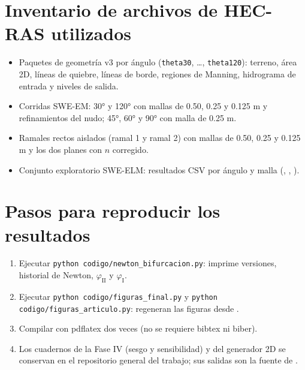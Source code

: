 \section{Inventario de archivos de HEC-RAS utilizados}
\begin{itemize}
\item Paquetes de geometría v3 por ángulo (\texttt{theta30}, \dots, \texttt{theta120}): terreno, área 2D, líneas de quiebre, líneas de borde, regiones de Manning, hidrograma de entrada y niveles de salida.
\item Corridas SWE-EM: 30° y 120° con mallas de 0.50, 0.25 y 0.125 m y refinamientos del nudo; 45°, 60° y 90° con malla de 0.25 m.
\item Ramales rectos aislados (ramal 1 y ramal 2) con mallas de 0.50, 0.25 y 0.125 m y los dos planes con $n$ corregido.
\item Conjunto exploratorio SWE-ELM: resultados CSV por ángulo y malla (, , ).
\end{itemize}

\section{Pasos para reproducir los resultados}
\begin{enumerate}
\item Ejecutar \texttt{python codigo/newton\_bifurcacion.py}: imprime versiones, historial de Newton, $\varphi_{\mathrm{II}}$ y $\varphi_{\mathrm I}$.
\item Ejecutar \texttt{python codigo/figuras\_final.py} y \texttt{python codigo/figuras\_articulo.py}: regeneran las figuras desde .
\item Compilar  con pdflatex dos veces (no se requiere bibtex ni biber).
\item Los cuadernos de la Fase IV (sesgo y sensibilidad) y del generador 2D se conservan en el repositorio general del trabajo; sus salidas son la fuente de .
\end{enumerate}
